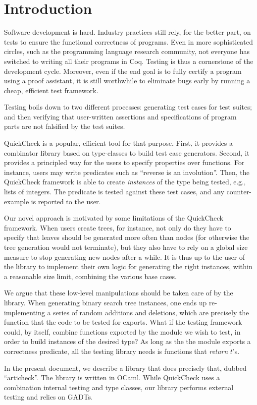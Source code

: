 \section{Introduction}

\newcommand{\qcheck}{QuickCheck\xspace}

Software development is hard. Industry practices still rely, for the better
part, on tests to ensure the functional correctness of programs. Even in more
sophisticated circles, such as the programming language research community, not
everyone has switched to writing all their programs in Coq. Testing is thus a
cornerstone of the development cycle. Moreover, even if the end goal is to fully
certify a program using a proof assistant, it is still worthwhile to eliminate
bugs early by running a cheap, efficient test framework.


Testing boils down to two different processes: generating test cases
for test suites; and then verifying that user-written assertions and
specifications of program parts are not falsified by the test suites.

\qcheck{} is a popular, efficient tool for that purpose. First, it
provides a combinator library based on type-classes to build test case
generators. Second, it provides a principled way for the users to
specify properties over functions. For instance, users may write
predicates such as ``reverse is an involution''. Then, the \qcheck
framework is able to create \emph{instances} of the type being tested,
e.g., lists of integers.  The predicate is tested against these test
cases, and any counter-example is reported to the user.

Our novel approach is motivated by some limitations of the \qcheck
framework.  When users create trees, for instance, not only do they
have to specify that leaves should be generated more often than nodes
(for otherwise the tree generation would not terminate), but they also
have to rely on a global size measure to stop generating new nodes
after a while. It is thus up to the user of the library to implement
their own logic for generating the right instances, within a
reasonable size limit, combining the various base cases.

We argue that these low-level manipulations should be taken care of by the
library. When generating binary search tree instances, one ends up
re-implementing a series of random additions and deletions, which are precisely
the function that the code to be tested for exports. What if the testing
framework could, by itself, combine functions exported by the module we wish to
test, in order to build instances of the desired type? As long as the the module
exports a correctness predicate, all the testing library needs is functions
that \emph{return} $t$'s.

In the present document, we describe a library that does precisely that, dubbed
``articheck''. The library is written in OCaml. While \qcheck uses a
combination internal testing and type classes, our library performs external
testing and relies on GADTs.
